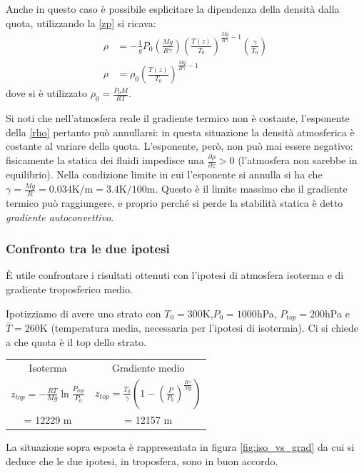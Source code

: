 Anche in questo caso è possibile esplicitare la dipendenza della densità dalla quota, utilizzando la \eqref{zp} si ricava:
\begin{align}
	\rho&=-\frac{1}{g}P_0\left(\frac{Mg}{R\gamma}\right)\left(\frac{T(z)}{T_0}\right)^{\frac{Mg}{R\gamma}-1}\left(\frac{\gamma}{T_0}\right)\\
	\rho&=\rho_0\left(\frac{T(z)}{T_0}\right)^{\frac{Mg}{R\gamma}-1}\label{rho}
\end{align}
dove si è utilizzato $\rho_0=\frac{P_0M}{RT}$.

Si noti che nell'atmosfera reale il gradiente termico non è costante, l'esponente della \eqref{rho} pertanto può annullarsi: in questa situazione la densità atmosferica è costante al variare della quota. L'esponente, però, non può mai essere negativo: fisicamente la statica dei fluidi impedisce una $\frac{\partial \rho}{\partial z} >0$ (l'atmosfera non sarebbe in equilibrio). Nella condizione limite in cui l'esponente si annulla si ha che $\gamma =\frac{Mg}{R}=0.034$K/m$=3.4$K$/100$m. Questo è il limite massimo che il gradiente termico può raggiungere, e proprio perché si perde la stabilità statica è detto \emph{gradiente autoconvettivo}. 

\subsubsection{Confronto tra le due ipotesi}
È utile confrontare i risultati ottenuti con l'ipotesi di atmosfera isoterma e di gradiente troposferico medio. 

Ipotizziamo di avere uno strato con $T_0=300$K,$P_0=1000$hPa, $P_{top}=200$hPa e $\bar{T}=260$K (temperatura media, necessaria per l'ipotesi di isotermia). Ci si chiede a che quota è il top dello strato. 
\begin{table}[h]
	\centering
	\begin{tabular}{c|c}
		Isoterma & Gradiente medio \\
		$z_{top}=-\frac{R\bar{T}}{Mg}\ln\frac{P_{top}}{P_0}$ & $z_{top}=\frac{T_0}{\gamma}\left(1-\left(\frac{P}{P_0}\right)^{\frac{R\gamma}{Mg}}\right)$\\
		= 12229 m & = 12157 m
	\end{tabular}
\end{table}

La situazione sopra esposta è rappresentata in figura \ref{fig:iso_vs_grad} da cui si deduce che le due ipotesi, in troposfera, sono in buon accordo. 

